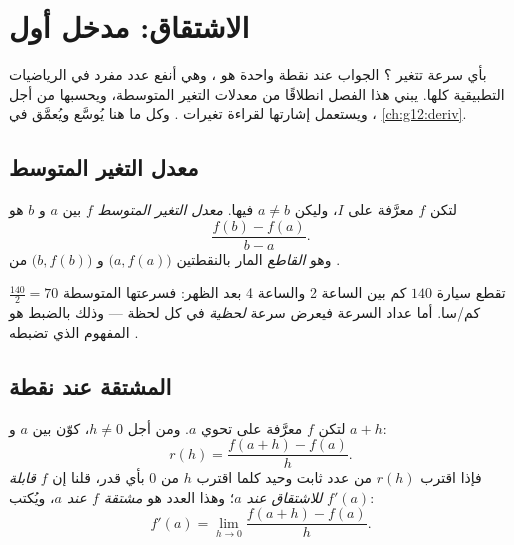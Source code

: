 \chapter{الاشتقاق: مدخل أول}\label{ch:g11:deriv}

بأي سرعة تتغير ؟ الجواب عند نقطة واحدة هو
\emph{}، وهي أنفع عدد مفرد في الرياضيات
التطبيقية كلها. يبني هذا الفصل  انطلاقًا من معدلات التغير المتوسطة،
ويحسبها من أجل ، ويستعمل إشارتها لقراءة
تغيرات . وكل ما هنا يُوسَّع ويُعمَّق في
\cref{ch:g12:deriv}.

\section{معدل التغير المتوسط}

\begin{definition}\label{def:g11:deriv:rate}
لتكن $f$ معرَّفة على  $I$، وليكن $a \neq b$ فيها. \emph{معدل
التغير المتوسط}  $f$ بين
$a$ و $b$ هو
\[
\frac{f(b) - f(a)}{b - a}.
\]
وهو  \emph{القاطع} المار بالنقطتين
$\bigl(a, f(a)\bigr)$ و $\bigl(b, f(b)\bigr)$ من .
\end{definition}

\begin{example}
تقطع سيارة $140$ كم بين الساعة 2 والساعة 4 بعد الظهر: فسرعتها المتوسطة
$\frac{140}{2} = 70$ كم/سا. أما عداد السرعة فيعرض
سرعة \emph{لحظية} في كل لحظة --- وذلك بالضبط هو المفهوم
الذي تضبطه .
\end{example}

\section{المشتقة عند نقطة}

\begin{definition}\label{def:g11:deriv:derivative}
لتكن $f$ معرَّفة على  تحوي $a$. ومن أجل $h \neq 0$، كوّن
 بين $a$ و $a + h$:
\[
r(h) = \frac{f(a+h) - f(a)}{h}.
\]
فإذا اقترب $r(h)$ من عدد ثابت وحيد كلما اقترب $h$ من
$0$ بأي قدر، قلنا إن $f$ \emph{قابلة للاشتقاق عند $a$}؛
وهذا العدد هو \emph{مشتقة $f$ عند $a$}، ويُكتب $f'(a)$:
\[
f'(a) = \lim_{h \to 0} \frac{f(a+h) - f(a)}{h}.
\]
\end{definition}

